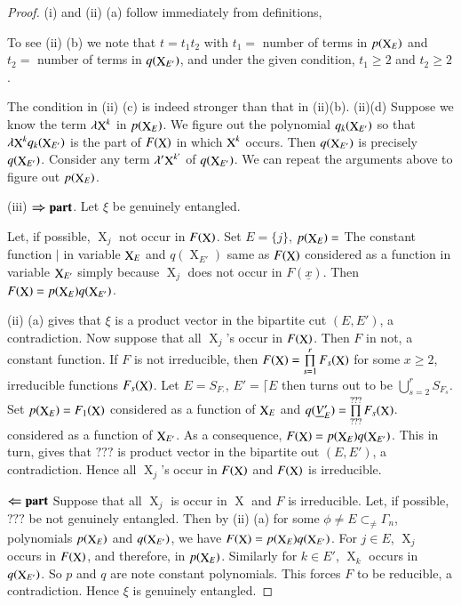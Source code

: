 \documentclass[a4paper,12pt]{article}
\DeclareMathOperator{\x}{\mathrm{X}}
\theoremstyle{definition}
\theoremstyle{underlinethm}
\theoremstyle{definition}
\begin{document}
 \begin{proof}
  (i) and (ii) (a) follow immediately from definitions,
  
  To see (ii) (b) we note that $t = t_{1} t_{2}$ with $t_{1} =$ number of terms in $p (\bold{\x}_{E})$ and $t_{2}=$ number of terms in $q(\bold{\x}_{E'})$, and under the given condition, $t_{1} \geq 2$ and $t_{2} \geq 2$.
  
  The condition in (ii) (c) is indeed stronger than that in (ii)(b). (ii)(d) Suppose we know the term $\lambda\bold{\x}^{k}$ in $p(\bold{\x}_{E})$. We figure out the polynomial $q_{k}(\bold{\x}_{E'})$ so that $\lambda \bold{\x}^{k} q_{k}(\bold{\x}_{E'})$ is the part of $F(\bold{\x})$ in which $\bold{\x}^{k}$ occurs. Then $q(\bold{\x}_{E'})$ is precisely $q(\bold{\x}_{E'})$. Consider any term $\lambda'\bold{\x}^{k'}$ of $q(\bold{\x}_{E'})$. We can repeat the arguments above to figure out $p(\bold{\x}_{E})$.
  
  (iii) ${\boldsymbol{\Rightarrow {\rm part}}}$. Let $\xi$ be genuinely entangled. 
  
  Let, if possible, $\x_{j}$ not occur in $F(\bold{\x})$. Set $E=\{j\}$, $p(\bold{\x}_{E})=$ The constant function $|$ in variable $\bold{\x}_{E}$ and $q(\x_{E'})$ same as $F(\bold{\x})$ considered as a function in variable $\bold{\x}_{E'}$ simply because $\x_{j}$ does not occur in $F(\underline{x})$. Then $F(\bold{\x}) = p(\bold{\x}_{E}) q (\bold{\x}_{E'})$. 
  
  (ii) (a) gives that  $\xi$ is a product vector in the bipartite cut $(E, E')$, a contradiction. Now suppose that all $\x_{j}$'s occur in $F(\bold{\x})$. Then $F$ in not, a constant function. If $F$ is not irreducible, then $F(\bold{\x}) = \prod\limits_{s=1}^{r} F_{s}(\bold{\x})$ for some $x \geq 2$, irreducible functions $F_{s}(\bold{\x})$. Let $E= S_{F_{'}}$, $E' = \lceil E$ then turns out to be $\bigcup\limits_{s=2}^{r} S_{F_{s}}$. Set $p(\bold{\x}_{E}) = F_{1}(\bold{\x})$ considered as a function of $\bold{\x}_{E}$ and $q(\underline{V}_{E}') = \prod\limits_{???}^{???} F_{s}(\bold{\x})$. considered as a function of $\bold{\x}_{E'}$. As a consequence, $F(\bold{\x}) = p (\bold{\x}_{E}) q (\bold{\x}_{E'})$. This in turn, gives that $???$ is product vector in the bipartite out $(E, E')$, a contradiction. Hence all $\x_{j}$'s occur in $F(\bold{\x})$ and $F(\bold{\x})$ is irreducible.
  
  ${\boldsymbol{\Leftarrow {\rm part}}}$ Suppose that all $\x_{j}$ is occur in $\x$ and $F$ is irreducible. Let, if possible, $???$ be not genuinely entangled. Then by (ii) (a) for some $\phi \neq E \subset_{\neq} \Gamma_{n}$, polynomials $p(\bold{\x}_{E})$ and $q(\bold{\x}_{E'})$, we have $F(\bold{\x}) = p(\bold{\x}_{E}) q (\x_{E'})$. For $j \in E$, $\x_{j}$ occurs in $F(\bold{\x})$, and therefore, in $p(\bold{\x}_{E})$. Similarly for $k \in E'$, $\x_{k}$ occurs in $q(\bold{\x}_{E'})$. So $p$ and $q$ are note constant polynomials. This forces $F$ to be reducible, a contradiction. Hence $\xi$ is genuinely entangled.
  

\end{proof}
\end{document}
